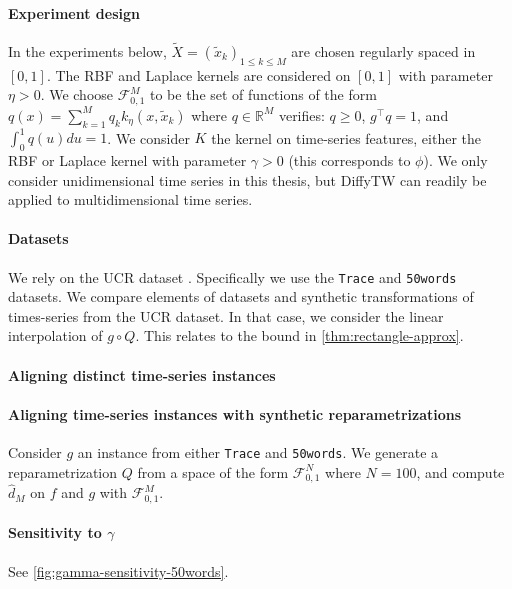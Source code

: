 \paragraph{Experiment design}
In the experiments below, $\tilde X = (\tilde x_k)_{1\leq k \leq M}$ are chosen regularly spaced in $[0,1]$. The RBF and Laplace kernels are considered on $[0,1]$ with parameter $\eta >0$. We choose $\mathcal F_{0,1}^M$ to be the set of functions of the form $q(x) = \sum_{k=1}^Mq_k k_\eta(x, \tilde x_k)$ where $q\in\mathbb R^M$ verifies: $q \geq 0$, $g^\top q =1$, and $\int_0^1 q(u)du =1$.
We consider $K$ the kernel on time-series features, either the RBF or Laplace kernel with parameter $\gamma> 0$ (this corresponds to $\phi$). We only consider unidimensional time series in this thesis, but DiffyTW can readily be applied to multidimensional time series.

\paragraph{Datasets} We rely on the UCR dataset \citep{ucr}. Specifically we use the \texttt{Trace} and \texttt{50words} datasets. We compare elements of datasets and synthetic transformations of times-series from the UCR dataset. In that case, we consider the linear interpolation of $g \circ Q$. This relates to the bound in \cref{thm:rectangle-approx}.

\paragraph{Aligning distinct time-series instances}

\paragraph{Aligning time-series instances with synthetic reparametrizations}
Consider $g$ an instance from either \texttt{Trace} and \texttt{50words}. We generate a reparametrization $Q$ from a space of the form $\mathcal F_{0,1}^{N}$ where $N = 100$, and compute $\hat d_M$ on $f$ and $g$ with $\mathcal F_{0,1}^M$.

\paragraph{Sensitivity to $\gamma$}

See \cref{fig:gamma-sensitivity-50words}.

